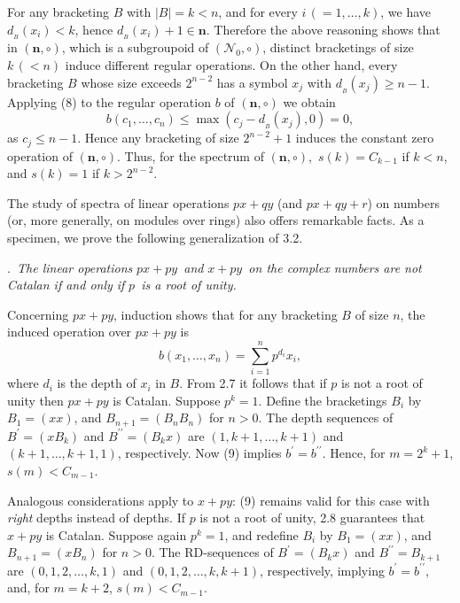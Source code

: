 \documentclass[a4paper,reqno]{amsart}\usepackage{amssymb,latexsym}
\theoremstyle{definition}
\theoremstyle{remark}
\numberwithin{equation}{section}
\numberwithin{theorem}{section}
\begin{document}
For any bracketing $B$ with $|B|=k<n$, and for every $i\,(=1,\ldots,k)$, we
have $d_{{}_{B}}(x_{i})<k$, hence $d_{{}_{B}}(x_{i})+1\in\mathbf{n}$.
Therefore the above reasoning shows that in $(\mathbf{n},\circ)$, which is a
subgroupoid of $(\mathcal{N}_{0},\circ)$, distinct bracketings of size
$k\,(<n)$ induce different regular operations. On the other hand, every
bracketing $B$ whose size exceeds $2^{n-2}$ has a symbol $x_{j}$ with
$d_{{}_{B}}(x_{j})\geq n-1$. Applying (8) to the regular operation $b$ of
$(\mathbf{n},\circ)$ we obtain\[
b(c_{1},\ldots,c_{n})\leq\max(c_{j}-d_{{}_{B}}(x_{j}),0)=0,
\]
as $c_{j}\leq n-1$. Hence any bracketing of size $2^{n-2}+1$ induces the
constant zero operation of $(\mathbf{n},\circ)$. Thus, for the spectrum of
$(\mathbf{n},\circ)$,~\thinspace$s(k)=C_{k-1}$ if $k<n$, and $s(k)=1$ if
$k>2^{n-2}$.

\smallskip

The study of spectra of linear operations $px+qy$ (and $px+qy+r$) on numbers
(or, more generally, on modules over rings) also offers remarkable facts. As a
specimen, we prove the following generalization of 3.2.

\bigskip

.\textit{\ The linear operations }$px+py$\textit{\ and }$x+py$\textit{\ on the complex numbers are not Catalan if and only if }$p$\textit{\ is a root of unity.}

\smallskip

Concerning $px+py$, induction shows that for any bracketing $B$ of size $n$,
the induced operation over $px+py$ is\begin{equation}
b(x_{1},\ldots,x_{n})=\sum_{i=1}^{n}p^{d_{i}}x_{i}, \tag{9}\end{equation}
where $d_{i}$ is the depth of $x_{i}$ in $B$. From 2.7 it follows that if $p$
is not a root of unity then $px+py$ is Catalan. Suppose $p^{k}=1$. Define the
bracketings $B_{i}$ by $B_{1}=(xx)$, and $B_{n+1}=(B_{n}B_{n})$ for $n>0$. The
depth sequences of $B^{\prime}=(xB_{k})$ and $B^{\prime\prime}=(B_{k}x)$ are
$(1,k+1,\ldots,k+1)$ and $(k+1,\ldots,k+1,1)$, respectively. Now (9) implies
$b^{\prime}=b^{\prime\prime}$. Hence, for $m=2^{k}+1$, $s(m)<C_{m-1}$.

Analogous considerations apply to $x+py$: (9) remains valid for this case with
\textit{right} depths instead of depths. If $p$ is not a root of unity, 2.8
guarantees that $x+py$ is Catalan. Suppose again $p^{k}=1$, and redefine
$B_{i}$ by $B_{1}=(xx)$, and $B_{n+1}=(xB_{n})$ for $n>0$. The RD-sequences of
$B^{\prime}=(B_{k}x)$ and $B^{\prime\prime}=B_{k+1}$ are $(0,1,2,\ldots,k,1)$
and $(0,1,2,\ldots,k,k+1)$, respectively, implying $b^{\prime}=b^{\prime
\prime}$, and, for $m=k+2$, \thinspace$s(m)<C_{m-1}$.
\end{document}
